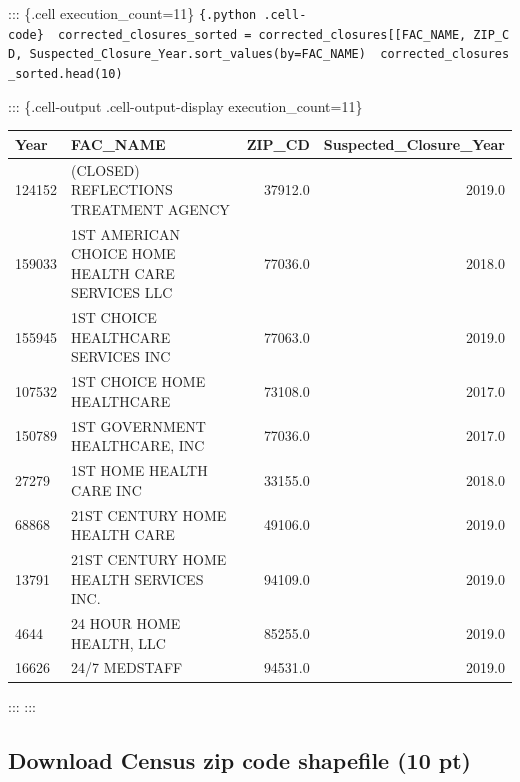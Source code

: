 \documentclass[
  letterpaper,
  DIV=11,
  numbers=noendperiod]{scrartcl}
\begin{document}
\begin{enumerate}
  ::: \{.cell execution\_count=11\}
  \texttt{\{.python\ .cell-code\}\ \ corrected\_closures\_sorted\ =\ corrected\_closures{[}{[}\textquotesingle{}FAC\_NAME\textquotesingle{},\ \textquotesingle{}ZIP\_CD\textquotesingle{},\ \textquotesingle{}Suspected\_Closure\_Year\textquotesingle{}{]}{]}.sort\_values(by=\textquotesingle{}FAC\_NAME\textquotesingle{})\ \ corrected\_closures\_sorted.head(10)}

  ::: \{.cell-output .cell-output-display execution\_count=11\}

  \begin{tabular}{llrr}
  \toprule
  Year &                                           FAC\_NAME &   ZIP\_CD &  Suspected\_Closure\_Year \\
  \midrule
  124152 &              (CLOSED) REFLECTIONS TREATMENT AGENCY &  37912.0 &                  2019.0 \\
  159033 &  1ST AMERICAN CHOICE HOME HEALTH CARE SERVICES LLC &  77036.0 &                  2018.0 \\
  155945 &                 1ST CHOICE HEALTHCARE SERVICES INC &  77063.0 &                  2019.0 \\
  107532 &                         1ST CHOICE HOME HEALTHCARE &  73108.0 &                  2017.0 \\
  150789 &                     1ST GOVERNMENT HEALTHCARE, INC &  77036.0 &                  2017.0 \\
  27279  &                           1ST HOME HEALTH CARE INC &  33155.0 &                  2018.0 \\
  68868  &                      21ST CENTURY HOME HEALTH CARE &  49106.0 &                  2019.0 \\
  13791  &             21ST CENTURY HOME HEALTH SERVICES INC. &  94109.0 &                  2019.0 \\
  4644   &                           24 HOUR HOME HEALTH, LLC &  85255.0 &                  2019.0 \\
  16626  &                                      24/7 MEDSTAFF &  94531.0 &                  2019.0 \\
  \bottomrule
  \end{tabular}

  ::: :::
\end{enumerate}

\subsection{Download Census zip code shapefile (10
pt)}\label{download-census-zip-code-shapefile-10-pt}
\end{document}
